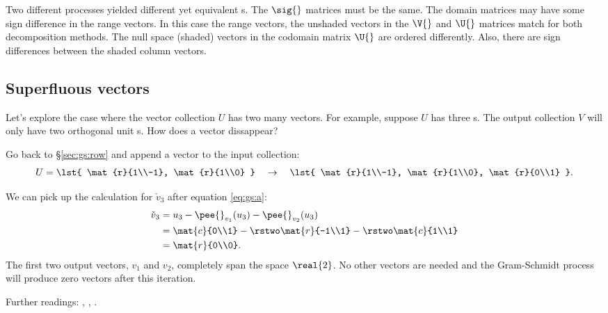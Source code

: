Two different processes yielded different yet equivalent \asvd s. The $\sig{}$ matrices must be the same. The domain matrices may have some sign difference in the range vectors. In this case the range vectors, the unshaded vectors in the $\V{}$ and $\U{}$ matrices match for both decomposition methods. The null space (shaded) vectors in the codomain matrix $\U{}$ are ordered differently. Also, there are sign differences between the shaded column vectors.

\subsection{Superfluous vectors}
Let's explore the case where the vector collection $U$ has two many vectors. For example, suppose $U$ has three \vv s. The output collection $V$ will only have two orthogonal unit \vv s. How does a vector dissappear?

Go back to \S\eqref{sec:gs:row} and append a vector to the input collection:
\begin{equation}
  U = \lst{
  \mat{r}{1\\-1},
  \mat{r}{1\\0}
  }
  \quad \rightarrow \quad
  \lst{
  \mat{r}{1\\-1},
  \mat{r}{1\\0},
  \mat{r}{0\\1}
  }.
\end{equation}

We can pick up the calculation for $\check{v}_{3}$ after equation \eqref{eq:gs:a}:
\begin{equation}
  \begin{split}
    \check{v}_{3} &= u_{3} - \pee{}_{v_{1}}(u_{3}) - \pee{}_{v_{2}}(u_{3})\\
    & = \mat{c}{0\\1} - \rstwo\mat{r}{-1\\1} - \rstwo\mat{c}{1\\1}\\
    & = \mat{r}{0\\0}.
  \end{split}
\end{equation}
The first two output vectors, $v_{1}$ and $v_{2}$, completely span the space $\real{2}$. No other vectors are needed and the Gram-Schmidt process will produce zero vectors after this iteration.

Further readings: \cite[ch. 5.5, p. 307]{Meyer2000}, \cite[ch. 5.5, p. 307]{Laub2005},  \cite[]{Strang2005}.


\endinput